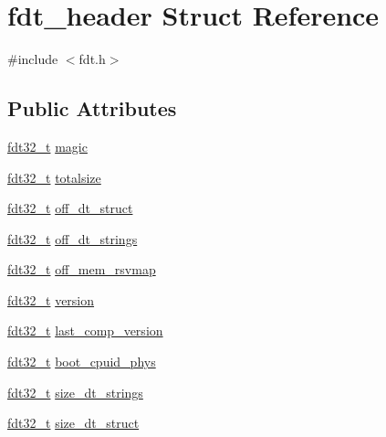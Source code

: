 \hypertarget{structfdt__header}{\section{fdt\-\_\-header Struct Reference}
\label{structfdt__header}
}


{\ttfamily \#include $<$fdt.\-h$>$}

\subsection*{Public Attributes}
\begin{DoxyCompactItemize}
\item 
\hyperlink{libfdt__env_8h_a76887ac8786252752fb3f9a39b21f3af}{fdt32\-\_\-t} \hyperlink{structfdt__header_a65fb0559969843780cf6d3192952af0a}{magic}
\item 
\hyperlink{libfdt__env_8h_a76887ac8786252752fb3f9a39b21f3af}{fdt32\-\_\-t} \hyperlink{structfdt__header_a142ef62b173b9e13c512bbb231106345}{totalsize}
\item 
\hyperlink{libfdt__env_8h_a76887ac8786252752fb3f9a39b21f3af}{fdt32\-\_\-t} \hyperlink{structfdt__header_a350b29eb98ea9ab1df4379e19d9f6a08}{off\-\_\-dt\-\_\-struct}
\item 
\hyperlink{libfdt__env_8h_a76887ac8786252752fb3f9a39b21f3af}{fdt32\-\_\-t} \hyperlink{structfdt__header_a4eb64188c5a8fecc9eb0acac4a0ac002}{off\-\_\-dt\-\_\-strings}
\item 
\hyperlink{libfdt__env_8h_a76887ac8786252752fb3f9a39b21f3af}{fdt32\-\_\-t} \hyperlink{structfdt__header_aceb981c230e48eea58d9501b2a52fada}{off\-\_\-mem\-\_\-rsvmap}
\item 
\hyperlink{libfdt__env_8h_a76887ac8786252752fb3f9a39b21f3af}{fdt32\-\_\-t} \hyperlink{structfdt__header_a5df82a5fef43c5d827478d41e78ed649}{version}
\item 
\hyperlink{libfdt__env_8h_a76887ac8786252752fb3f9a39b21f3af}{fdt32\-\_\-t} \hyperlink{structfdt__header_a230fb2743cc67cc1dd20d7e92fddae1e}{last\-\_\-comp\-\_\-version}
\item 
\hyperlink{libfdt__env_8h_a76887ac8786252752fb3f9a39b21f3af}{fdt32\-\_\-t} \hyperlink{structfdt__header_ac2746c258f91f98614e281b078863d00}{boot\-\_\-cpuid\-\_\-phys}
\item 
\hyperlink{libfdt__env_8h_a76887ac8786252752fb3f9a39b21f3af}{fdt32\-\_\-t} \hyperlink{structfdt__header_a64c5ed9e447a81137bf30a6bc3c627ee}{size\-\_\-dt\-\_\-strings}
\item 
\hyperlink{libfdt__env_8h_a76887ac8786252752fb3f9a39b21f3af}{fdt32\-\_\-t} \hyperlink{structfdt__header_a5d7585b3780d6e983fe0924a0e23ffcb}{size\-\_\-dt\-\_\-struct}
\end{DoxyCompactItemize}



